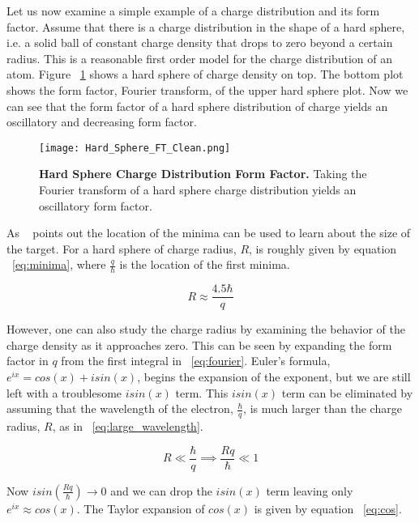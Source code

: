 Let us now examine a simple example of a charge distribution and its form factor. Assume that there is a charge distribution in the shape of a hard sphere, i.e. a solid ball of constant charge density that drops to zero beyond a certain radius. This is a reasonable first order model for the charge distribution of an atom. Figure ~\ref{fig:hard_sphere} shows a hard sphere of charge density on top. The bottom plot shows the form factor, Fourier transform, of the upper hard sphere plot. Now we can see that the form factor of a hard sphere distribution of charge yields an oscillatory and decreasing form factor.

\begin{figure}[!ht]
\begin{center}
\texttt{[image: Hard\_Sphere\_FT\_Clean.png]}
\end{center}
\caption{
{\bf{Hard Sphere Charge Distribution Form Factor.}} Taking the Fourier transform of a hard sphere charge distribution yields an oscillatory form factor.}
\label{fig:hard_sphere}
\end{figure}

As ~\cite{Book:Povh} points out the location of the minima can be used to learn about the size of the target. For a hard sphere of charge radius, $R$, is roughly given by equation ~\ref{eq:minima}, where $\frac{q}{\hbar}$ is the location of the first minima. 

\begin{equation} \label{eq:minima}
	R \approx \frac{4.5 \hbar}{q}
\end{equation}

\noindent However, one can also study the charge radius by examining the behavior of the charge density as it approaches zero. This can be seen by expanding the form factor in $q$ from the first integral in ~\ref{eq:fourier}. Euler's formula, $e^{ix} = cos(x)+isin(x)$, begins the expansion of the exponent, but we are still left with a troublesome $isin(x)$ term. This $isin(x)$ term can be eliminated by assuming that the wavelength of the electron, $\frac{\hbar}{q}$, is much larger than the charge radius, $R$, as in ~\ref{eq:large_wavelength}.

\begin{equation} \label{eq:large_wavelength}
	R \ll \frac{\hbar}{q} \implies \frac{Rq}{\hbar} \ll 1
\end{equation}

Now $isin\left(\frac{Rq}{\hbar}\right) \xrightarrow{} 0$ and we can drop the $isin(x)$ term leaving only $e^{ix} \approx cos(x)$. The Taylor expansion of $cos(x)$ is given by equation ~\ref{eq:cos}.


